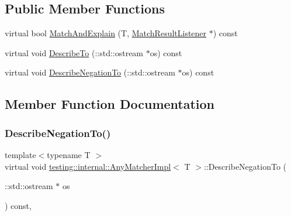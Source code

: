\subsection*{Public Member Functions}
\begin{DoxyCompactItemize}
\item 
virtual bool \hyperlink{classtesting_1_1internal_1_1_any_matcher_impl_ac2d8f01b1c8ede16295f03eda91c5de1}{Match\+And\+Explain} (T, \hyperlink{classtesting_1_1_match_result_listener}{Match\+Result\+Listener} $\ast$) const
\item 
virtual void \hyperlink{classtesting_1_1internal_1_1_any_matcher_impl_a743f037083cc9992a4cc0d4e9842bc86}{Describe\+To} (\+::std\+::ostream $\ast$os) const
\item 
virtual void \hyperlink{classtesting_1_1internal_1_1_any_matcher_impl_ac6570e881174ba774b8d56abaa4f7d25}{Describe\+Negation\+To} (\+::std\+::ostream $\ast$os) const
\end{DoxyCompactItemize}


\subsection{Member Function Documentation}
\mbox{\label{classtesting_1_1internal_1_1_any_matcher_impl_ac6570e881174ba774b8d56abaa4f7d25}} 
\subsubsection{\texorpdfstring{Describe\+Negation\+To()}{DescribeNegationTo()}}
{\footnotesize\ttfamily template$<$typename T $>$ \\
virtual void \hyperlink{classtesting_1_1internal_1_1_any_matcher_impl}{testing\+::internal\+::\+Any\+Matcher\+Impl}$<$ T $>$\+::Describe\+Negation\+To (\begin{DoxyParamCaption}\item[{\+::std\+::ostream $\ast$}]{os }\end{DoxyParamCaption}) const\hspace{0.3cm}{\ttfamily [inline]}, {\ttfamily [virtual]}}



